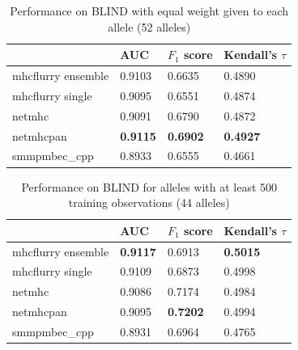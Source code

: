 \begin{table}[h]
\begin{tabular}{llll}
\toprule
{} &              AUC &      $F_1$ score & Kendall's $\tau$ \\
\midrule
mhcflurry ensemble &           0.9103 &           0.6635 &           0.4890 \\
mhcflurry single   &           0.9095 &           0.6551 &           0.4874 \\
netmhc             &           0.9091 &           0.6790 &           0.4872 \\
netmhcpan          &  \textbf{0.9115} &  \textbf{0.6902} &  \textbf{0.4927} \\
smmpmbec_cpp       &           0.8933 &           0.6555 &           0.4661 \\
\bottomrule
\end{tabular}

\caption{Performance on BLIND with equal weight given to each allele (52 alleles)}
\label{tab:alleleweighted}
\end{table}

\begin{table}[h]
\begin{tabular}{llll}
\toprule
{} &              AUC &      $F_1$ score & Kendall's $\tau$ \\
\midrule
mhcflurry ensemble &  \textbf{0.9117} &           0.6913 &  \textbf{0.5015} \\
mhcflurry single   &           0.9109 &           0.6873 &           0.4998 \\
netmhc             &           0.9086 &           0.7174 &           0.4984 \\
netmhcpan          &           0.9095 &  \textbf{0.7202} &           0.4994 \\
smmpmbec_cpp       &           0.8931 &           0.6964 &           0.4765 \\
\bottomrule
\end{tabular}

\caption{Performance on BLIND for alleles with at least 500 training observations (44 alleles)}
\label{tab:alleleweightedbig}
\end{table}

